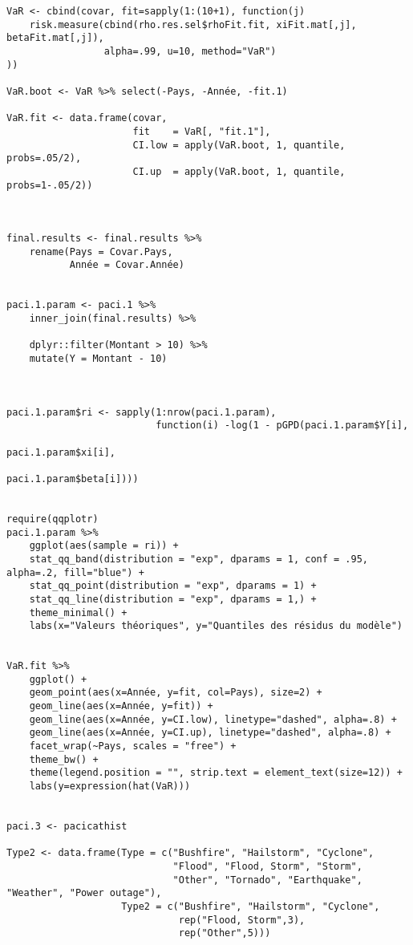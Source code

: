 \begin{lstlisting}
VaR <- cbind(covar, fit=sapply(1:(10+1), function(j)
    risk.measure(cbind(rho.res.sel$rhoFit.fit, xiFit.mat[,j], betaFit.mat[,j]),
                 alpha=.99, u=10, method="VaR")
))

VaR.boot <- VaR %>% select(-Pays, -Année, -fit.1)

VaR.fit <- data.frame(covar, 
                      fit    = VaR[, "fit.1"], 
                      CI.low = apply(VaR.boot, 1, quantile, probs=.05/2),
                      CI.up  = apply(VaR.boot, 1, quantile, probs=1-.05/2))



final.results <- final.results %>% 
    rename(Pays = Covar.Pays,
           Année = Covar.Année) 


paci.1.param <- paci.1 %>% 
    inner_join(final.results) %>% 
    
    dplyr::filter(Montant > 10) %>% 
    mutate(Y = Montant - 10)



paci.1.param$ri <- sapply(1:nrow(paci.1.param), 
                          function(i) -log(1 - pGPD(paci.1.param$Y[i], 
                                                    paci.1.param$xi[i], 
                                                    paci.1.param$beta[i])))


require(qqplotr)
paci.1.param %>% 
    ggplot(aes(sample = ri)) +
    stat_qq_band(distribution = "exp", dparams = 1, conf = .95, alpha=.2, fill="blue") +
    stat_qq_point(distribution = "exp", dparams = 1) + 
    stat_qq_line(distribution = "exp", dparams = 1,) + 
    theme_minimal() +
    labs(x="Valeurs théoriques", y="Quantiles des résidus du modèle")
    
    
VaR.fit %>%  
    ggplot() + 
    geom_point(aes(x=Année, y=fit, col=Pays), size=2) + 
    geom_line(aes(x=Année, y=fit)) + 
    geom_line(aes(x=Année, y=CI.low), linetype="dashed", alpha=.8) + 
    geom_line(aes(x=Année, y=CI.up), linetype="dashed", alpha=.8) + 
    facet_wrap(~Pays, scales = "free") + 
    theme_bw() + 
    theme(legend.position = "", strip.text = element_text(size=12)) +
    labs(y=expression(hat(VaR)))
    
    
paci.3 <- pacicathist

Type2 <- data.frame(Type = c("Bushfire", "Hailstorm", "Cyclone", 
                             "Flood", "Flood, Storm", "Storm", 
                             "Other", "Tornado", "Earthquake", "Weather", "Power outage"),
                    Type2 = c("Bushfire", "Hailstorm", "Cyclone",
                              rep("Flood, Storm",3), 
                              rep("Other",5)))


\end{lstlisting}
